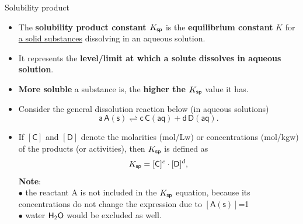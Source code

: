 %
%
\begin{frame}{Solubility product}
	\small
	\begin{itemize}
		\item The \alert{\bf solubility product constant $K_{\sf sp}$} is the {\bf equilibrium constant} $K$ for \underline{a solid substances} 
		dissolving in an aqueous solution.
		\pause
		\item It represents the {\bf level/limit at which a solute dissolves in aqueous solution}.
		\pause
		\item {\bf More soluble} a substance is, the {\bf higher the $K_{\sf sp}$} value it has.
		\pause
		\item Consider the general dissolution reaction below (in aqueous solutions)
		\[
		\mathsf{a\, A(s) \rightleftharpoons c\, C(aq) + d\, D (aq)}.
		\]
		\vskip -10pt
		\pause
		\item If $\mathsf{[C]}$ and  $\mathsf{[D]}$ denote the molarities  (mol/Lw) or concentrations (mol/kgw) of the products (or activities), then $K_{\sf sp} $ is defined as
		\[
		K_{\sf sp} = [\mathsf{C}]^c \cdot [\mathsf{D}]^d,
		\] 
		{\bf Note}: \\
		\quad $\bullet$ the reactant A is not included in the $K_{\sf sp}$  equation, because its concentrations do not change the expression
		due to $\mathsf{[A(s)]}$=1 \\
		\quad $\bullet$ water ${\sf H_2O}$ would be excluded as well.	
	\end{itemize}
\end{frame}
%
%

